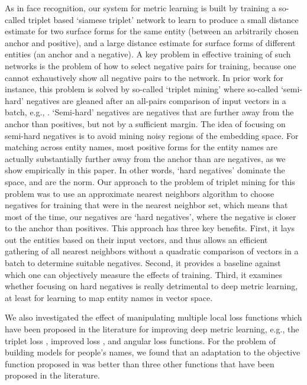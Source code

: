 As in face recognition, our system for metric learning is built by training a so-called triplet based `siamese triplet' network to learn to produce a small distance estimate for two surface forms for the same entity (between an arbitrarily chosen anchor and positive), and a large distance estimate for surface forms of different entities (an anchor and a negative).  A key problem in effective training of such networks is the problem of how to select negative pairs for training, because one cannot exhaustively show all negative pairs to the network.  In prior work for instance, this problem is solved by so-called `triplet mining' where so-called `semi-hard' negatives are gleaned after an all-pairs comparison of input vectors in a batch, e.g., \cite{DBLP:conf/cvpr/SchroffKP15}.  `Semi-hard' negatives are negatives that are further away from the anchor than positives, but not by a sufficient margin.  The idea of focusing on semi-hard negatives is to avoid mining noisy regions of the embedding space.  For matching across entity names, most positive forms for the entity names are actually substantially further away from the anchor than are negatives, as we show empirically in this paper.  In other words, `hard negatives' dominate the space, and are the norm.  Our approach to the problem of triplet mining for this problem was to use an approximate nearest neighbors algorithm to choose negatives for training that were in the nearest neighbor set, which means that most of the time, our negatives are `hard negatives', where the negative is closer to the anchor than positives.  This approach has three key benefits.  First, it lays out the entities based on their input vectors, and thus allows an efficient gathering of all nearest neighbors without a quadratic comparison of vectors in a batch to determine suitable negatives.  Second, it provides a baseline against which one can objectively measure the effects of training.  Third, it examines whether focusing on hard negatives is really detrimental to deep metric learning, at least for learning to map entity names in vector space.

We also investigated the effect of manipulating multiple local loss functions which have been proposed in the literature for improving deep metric learning, e.g., the triplet loss \cite{DBLP:conf/cvpr/SchroffKP15}, improved loss \cite{Zhang:2016:DML:3088616.3088665}, and angular loss \cite{DBLP:journals/corr/abs-1708-01682} functions.  For the problem of building models for people's names, we found that an adaptation to the objective function proposed in \cite{DBLP:conf/cvpr/SchroffKP15} was better than three other functions that have been proposed in the literature. 

